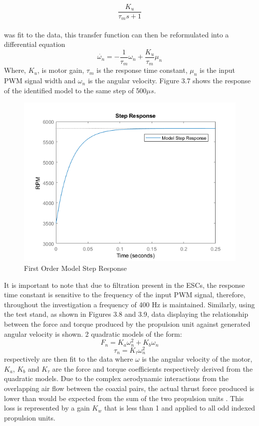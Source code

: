 \documentclass[12pt,a4paper,twoside]{report}
\begin{document}
			\\
			\[ \frac{K_u}{\tau_m s + 1} \]
			\\
			was fit to the data, this transfer function can then be reformulated into a differential equation
			\begin{equation}
				\dot{\omega_n} = -\frac{1}{\tau_m}\omega_n	 + \frac{K_u}{\tau_m}\mu_n
			\end{equation}
			Where, $K_u$, is motor gain, $\tau_m$ is the response time constant, $\mu_n$ is the input PWM signal width and $\omega_n$ is the angular velocity. Figure 3.7 shows the response of the identified model to the same step of 500$\mu s$.
			
			\begin{figure}[h!]
				\centering
				\includegraphics[width=0.7\linewidth]{ModelStep.png}
				\caption{First Order Model Step Response}
				\label{fig:modelstep}
			\end{figure}
			
			It is important to note that due to filtration present in the ESCs, the response time constant is sensitive to the frequency of the input PWM signal, therefore, throughout the investigation a frequency of 400 Hz is maintained. Similarly, using the test stand, as shown in Figures 3.8 and 3.9, data displaying the relationship between the force and torque produced by the propulsion unit against generated angular velocity is shown. 2 quadratic models of the form: 
			\begin{equation}
				F_n = K_a \omega_n^2 + K_b\omega_n
			\end{equation}
			\begin{equation}
				\tau_n = K_\tau \omega_n^2
			\end{equation}
			respectively are then fit to the data where $\omega$ is the angular velocity of the motor, $K_a$, $K_b$ and $K_\tau$ are the force and torque coefficients respectively derived from the quadratic models. Due to the complex aerodynamic interactions from the overlapping air flow between the coaxial pairs, the actual thrust force produced is lower than would be expected from the sum of the two propulsion units \cite{14}. This loss is represented by a gain $K_w$ that is less than 1 and applied to all odd indexed propulsion units.	
			
\end{document}
